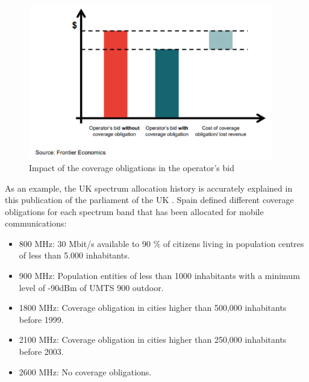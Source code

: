 
\begin{figure}[H]
	\begin{Center}
		\includegraphics[width=0.95\textwidth]{./media/image8.png}
		\caption{Impact of the coverage obligations in the operator's bid \cite{2-03}}
	\end{Center}
\end{figure}


As an example, the UK spectrum allocation history is accurately explained in this publication of the parliament of the UK \cite{2-07}. Spain defined different coverage obligations for each spectrum band that has been allocated for mobile communications:\par
\begin{itemize}
	\item 800 MHz: 30 Mbit/s available to 90 $\%$  of citizens living in population centres of less than 5.000 inhabitants.\par

	\item 900 MHz: Population entities of less than 1000 inhabitants with a minimum level of -90dBm of UMTS 900 outdoor.\par

	\item 1800 MHz: Coverage obligation in cities higher than 500,000 inhabitants before 1999.\par

	\item 2100 MHz: Coverage obligation in cities higher than 250,000 inhabitants before 2003.\par

	\item 2600 MHz: No coverage obligations.
\end{itemize}\par

